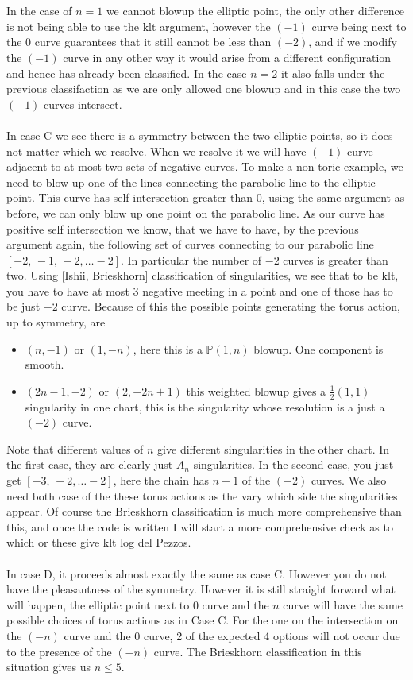 \documentclass[11pt]{amsart}
\theoremstyle{plain}
\begin{document}
\\
\\
In the case of $n=1$ we cannot blowup the elliptic point, the only other difference is not being able to use the klt argument, however the $(-1)$ curve being next to the 0 curve guarantees that it still cannot be less than $(-2)$, and if we modify the $(-1)$ curve in any other way it would arise from a different configuration and hence has already been classified. In the case $n = 2$ it also falls under the previous classifaction as we are only allowed one blowup and in this case the two $(-1)$ curves intersect.
\\
\\
In case C we see there is a symmetry between the two elliptic points, so it does not matter which we resolve. When we resolve it we will have $(-1)$ curve adjacent to at most two sets of negative curves. To make a non toric example, we need to blow up one of the lines connecting the parabolic line to the elliptic point. This curve has self intersection greater than 0, using the same argument as before, we can only blow up one point on the parabolic line. As our curve has positive self intersection we know, that we have to have, by the previous argument again, the following set of curves connecting to our parabolic line $[-2, \, -1, \,  -2, \dots -2 ]$. In particular the number of $-2$ curves is greater than two. Using [Ishii, Brieskhorn] classification of singularities, we see that to be klt, you have to have at most 3 negative meeting in a point and one of those has to be just $-2$ curve. Because of this the possible points generating the torus action, up to symmetry, are 
\\
\begin{itemize}
\item $(n, -1)$ or $(1, -n)$, here this is a $\mathbb{P}(1, n)$ blowup. One component is smooth.
\item $(2n - 1, -2)$ or $(2, -2n+1)$ this weighted blowup gives a $\frac{1}{2}(1,1)$ singularity in one chart, this is the singularity whose resolution is a just a $(-2)$ curve. 
\end{itemize}
Note that different values of $n$ give different singularities in the other chart. In the first case, they are clearly just $A_n$ singularities. In the second case, you just get $[-3, \, -2, \dots -2]$, here the chain has $n-1$ of the $(-2)$ curves. We also need both case of the these torus actions as the vary which side the singularities appear. Of course the Brieskhorn classification is much more comprehensive than this, and once the code is written I will start a more comprehensive check as to which or these give klt log del Pezzos. 
\\
\\
In case D, it proceeds almost exactly the same as case C. However you do not have the pleasantness of the symmetry. However it is still straight forward what will happen, the elliptic point next to $0$ curve and the $n$ curve will have the same possible choices of torus actions as in Case C. For the one on the intersection on the $(-n)$ curve and the 0 curve, 2 of the expected 4 options will not occur due to the presence of the $(-n)$ curve. The Brieskhorn classification in this situation gives us $n \leq 5$.
\end{document}
